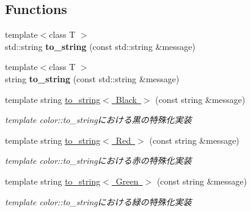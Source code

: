 \subsection*{Functions}
\begin{DoxyCompactItemize}
\item 
\mbox{\label{namespace_g_a_1_1color_a991c9678371bcdbab15601fb7effba9e}} 
{\footnotesize template$<$class T $>$ }\\std\+::string {\bfseries to\+\_\+string} (const std\+::string \&message)
\item 
\mbox{\label{namespace_g_a_1_1color_ac7fb00295164b2849f9b10301687db74}} 
{\footnotesize template$<$class T $>$ }\\string {\bfseries to\+\_\+string} (const std\+::string \&message)
\item 
\mbox{\label{namespace_g_a_1_1color_a5be6c7e4f882c4d592a8da0f0a347067}} 
template string \mbox{\hyperlink{namespace_g_a_1_1color_a5be6c7e4f882c4d592a8da0f0a347067}{to\+\_\+string$<$ Black $>$}} (const string \&message)
\begin{DoxyCompactList}\small\item\em template color\+::to\+\_\+stringにおける黒の特殊化実装 \end{DoxyCompactList}\item 
\mbox{\label{namespace_g_a_1_1color_a6a01cc38b05e377a20433414f3706a0b}} 
template string \mbox{\hyperlink{namespace_g_a_1_1color_a6a01cc38b05e377a20433414f3706a0b}{to\+\_\+string$<$ Red $>$}} (const string \&message)
\begin{DoxyCompactList}\small\item\em template color\+::to\+\_\+stringにおける赤の特殊化実装 \end{DoxyCompactList}\item 
\mbox{\label{namespace_g_a_1_1color_a14e62c006964b6702bbdd28346bf4bab}} 
template string \mbox{\hyperlink{namespace_g_a_1_1color_a14e62c006964b6702bbdd28346bf4bab}{to\+\_\+string$<$ Green $>$}} (const string \&message)
\begin{DoxyCompactList}\small\item\em template color\+::to\+\_\+stringにおける緑の特殊化実装 \end{DoxyCompactList}\item 

\end{DoxyCompactItemize}
